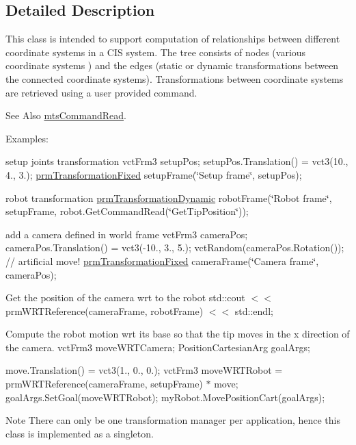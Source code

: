\subsection{Detailed Description}
This class is intended to support computation of relationships between different coordinate systems in a C\-I\-S system. The tree consists of nodes (various coordinate systems ) and the edges (static or dynamic transformations between the connected coordinate systems). Transformations between coordinate systems are retrieved using a user provided command. \begin{DoxySeeAlso}{See Also}
\hyperlink{classmts_command_read}{mts\-Command\-Read}.
\end{DoxySeeAlso}
Examples\-: {\ttfamily }

{\ttfamily setup joints transformation vct\-Frm3 setup\-Pos; setup\-Pos.\-Translation() = vct3(10., 4., 3.); \hyperlink{classprm_transformation_fixed}{prm\-Transformation\-Fixed} setup\-Frame(\char`\"{}\-Setup frame\char`\"{}, setup\-Pos);}

{\ttfamily robot transformation \hyperlink{classprm_transformation_dynamic}{prm\-Transformation\-Dynamic} robot\-Frame(\char`\"{}\-Robot frame\char`\"{}, setup\-Frame, robot.\-Get\-Command\-Read(\char`\"{}\-Get\-Tip\-Position\char`\"{}));}

{\ttfamily add a camera defined in world frame vct\-Frm3 camera\-Pos; camera\-Pos.\-Translation() = vct3(-\/10., 3., 5.); vct\-Random(camera\-Pos.\-Rotation()); // artificial move! \hyperlink{classprm_transformation_fixed}{prm\-Transformation\-Fixed} camera\-Frame(\char`\"{}\-Camera frame\char`\"{}, camera\-Pos);}

{\ttfamily Get the position of the camera wrt to the robot std\-::cout $<$$<$ prm\-W\-R\-T\-Reference(camera\-Frame, robot\-Frame) $<$$<$ std\-::endl;}

{\ttfamily Compute the robot motion wrt its base so that the tip moves in the x direction of the camera. vct\-Frm3 move\-W\-R\-T\-Camera; Position\-Cartesian\-Arg goal\-Args;}

{\ttfamily  move.\-Translation() = vct3(1., 0., 0.); vct\-Frm3 move\-W\-R\-T\-Robot = prm\-W\-R\-T\-Reference(camera\-Frame, setup\-Frame) $\ast$ move; goal\-Args.\-Set\-Goal(move\-W\-R\-T\-Robot); my\-Robot.\-Move\-Position\-Cart(goal\-Args);}

{\ttfamily  }

\begin{DoxyNote}{Note}
There can only be one transformation manager per application, hence this class is implemented as a singleton. 
\end{DoxyNote}


